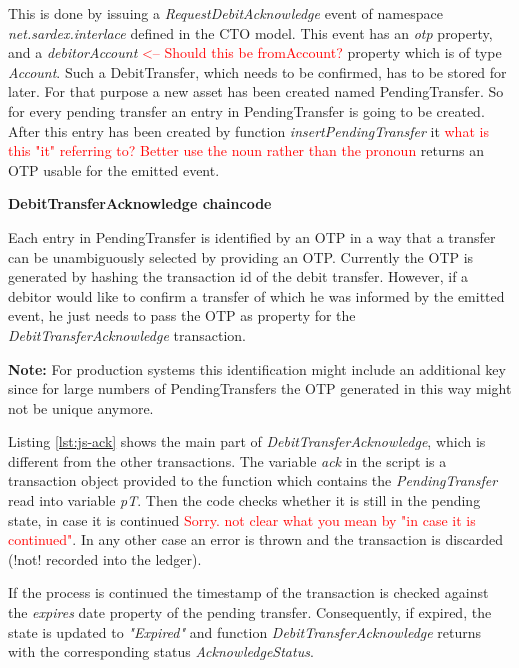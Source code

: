 This is done by issuing a \textit{RequestDebitAcknowledge} event of namespace \textit{net.sardex.interlace} defined in the CTO model. This event has an \textit{otp} property, and a \textit{debitorAccount} \textcolor{red}{<-- Should this be fromAccount?} property which is of type \textit{Account}. Such a DebitTransfer, which needs to be confirmed, has to be stored for later. For that purpose a new asset has been created named PendingTransfer. So for every pending transfer an entry in PendingTransfer is going to be created. After this entry has been created by function \textit{insertPendingTransfer} it \textcolor{red}{what is this "it" referring to? Better use the noun rather than the pronoun} returns an OTP usable for the emitted event.

\textbf{DebitTransferAcknowledge chaincode}

Each entry in PendingTransfer is identified by an OTP in a way that a transfer can be unambiguously selected by providing an OTP. Currently the OTP is generated by hashing the transaction id of the debit transfer. However, if a debitor would like to confirm a transfer of which he was informed by the emitted event, he just needs to pass the OTP as property for the \textit{DebitTransferAcknowledge} transaction.

\textbf{Note:} For production systems this identification might include an additional key since for large numbers of PendingTransfers the OTP generated in this way might not be unique anymore.

Listing \ref{lst:js-ack} shows the main part of \textit{DebitTransferAcknowledge}, which is different from the other transactions. The variable \textit{ack} in the script is a transaction object provided to the function which contains the \textit{PendingTransfer} read into variable \textit{pT}. Then the code checks whether it is still in the pending state, in case it is continued \textcolor{red}{Sorry. not clear what you mean by "in case it is continued"}. In any other case an error is thrown and the transaction is discarded (!not! recorded into the ledger).

If the process is continued the timestamp of the transaction is checked against the \textit{expires} date property of the pending transfer. Consequently, if expired, the state is updated to \textit{"Expired"} and function \textit{DebitTransferAcknowledge} returns with the corresponding status \textit{AcknowledgeStatus}.


